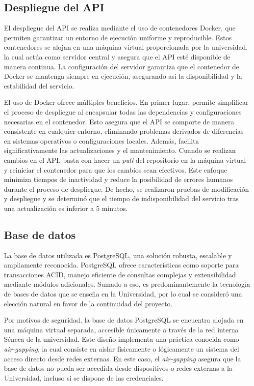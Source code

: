 \subsection{Despliegue del API}
\label{sec:despliegue_api}

El despliegue del \gls{API} se realiza mediante el uso de contenedores \gls{Docker}, que permiten garantizar un entorno de ejecución uniforme y reproducible. Estos contenedores se alojan en una máquina virtual proporcionada por la universidad, la cual actúa como servidor central y asegura que el \gls{API} esté disponible de manera continua. La configuración del servidor garantiza que el contenedor de \gls{Docker} se mantenga siempre en ejecución, asegurando así la disponibilidad y la estabilidad del servicio.

El uso de \gls{Docker} ofrece múltiples beneficios. En primer lugar, permite simplificar el proceso de despliegue al encapsular todas las dependencias y configuraciones necesarias en el contenedor. Esto asegura que el \gls{API} se comporte de manera consistente en cualquier entorno, eliminando problemas derivados de diferencias en sistemas operativos o configuraciones locales. Además, facilita significativamente las actualizaciones y el mantenimiento. Cuando se realizan cambios en el \gls{API}, basta con hacer un \textit{pull} del repositorio en la máquina virtual y reiniciar el contenedor para que los cambios sean efectivos. Este enfoque minimiza tiempos de inactividad y reduce la posibilidad de errores humanos durante el proceso de despliegue. De hecho, se realizaron pruebas de modificación y despliegue y se determinó que el tiempo de indisponibilidad del servicio tras una actualización es inferior a 5 minutos.

\subsection{Base de datos}

La base de datos utilizada es \gls{PostgreSQL}, una solución robusta, escalable y ampliamente reconocida. \gls{PostgreSQL} ofrece características como soporte para transacciones ACID, manejo eficiente de consultas complejas y extensibilidad mediante módulos adicionales. Sumado a eso, es predominantemente la tecnología de bases de datos que se enseña en la Universidad, por lo cual se consideró una elección natural en favor de la continuidad del proyecto.

Por motivos de seguridad, la base de datos \gls{PostgreSQL} se encuentra alojada en una máquina virtual separada, accesible únicamente a través de la red interna Séneca de la universidad. Este diseño implementa una práctica conocida como \textit{air-gapping}, la cual consiste en aislar físicamente o lógicamente un sistema del acceso directo desde redes externas. En este caso, el \textit{air-gapping} asegura que la base de datos no pueda ser accedida desde dispositivos o redes externas a la Universidad, incluso si se dispone de las credenciales.

